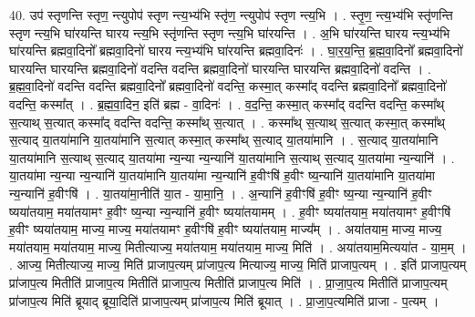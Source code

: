 \documentclass[17pt]{extarticle}
\begin{document}
40. उप॑ स्तृणन्ति स्तृण॒ न्त्युपोप॑ स्तृण न्त्य॒भ्य॑भि स्तृ॑ण॒ न्त्युपोप॑ स्तृण न्त्य॒भि । . स्तृ॒ण॒ न्त्य॒भ्य॑भि स्तृ॑णन्ति स्तृण न्त्य॒भि घा॑रयन्ति घारय न्त्य॒भि स्तृ॑णन्ति स्तृण न्त्य॒भि घा॑रयन्ति । . अ॒भि घा॑रयन्ति घारय न्त्य॒भ्य॑भि घा॑रयन्ति ब्रह्मवा॒दिनो᳚ ब्रह्मवा॒दिनो॑ घारय न्त्य॒भ्य॑भि घा॑रयन्ति ब्रह्मवा॒दिनः॑ । . घा॒र॒य॒न्ति॒ ब्र॒ह्म॒वा॒दिनो᳚ ब्रह्मवा॒दिनो॑ घारयन्ति घारयन्ति ब्रह्मवा॒दिनो॑ वदन्ति वदन्ति ब्रह्मवा॒दिनो॑ घारयन्ति घारयन्ति ब्रह्मवा॒दिनो॑ वदन्ति । . ब्र॒ह्म॒वा॒दिनो॑ वदन्ति वदन्ति ब्रह्मवा॒दिनो᳚ ब्रह्मवा॒दिनो॑ वदन्ति॒ कस्मा॒त् कस्मा᳚द् वदन्ति ब्रह्मवा॒दिनो᳚ ब्रह्मवा॒दिनो॑ वदन्ति॒ कस्मा᳚त् । . ब्र॒ह्म॒वा॒दिन॒ इति॑ ब्रह्म - वा॒दिनः॑ । . व॒द॒न्ति॒ कस्मा॒त् कस्मा᳚द् वदन्ति वदन्ति॒ कस्मा᳚थ् स॒त्याथ् स॒त्यात् कस्मा᳚द् वदन्ति वदन्ति॒ कस्मा᳚थ् स॒त्यात् । . कस्मा᳚थ् स॒त्याथ् स॒त्यात् कस्मा॒त् कस्मा᳚थ् स॒त्याद् या॒तया॑मानि या॒तया॑मानि स॒त्यात् कस्मा॒त् कस्मा᳚थ् स॒त्याद् या॒तया॑मानि । . स॒त्याद् या॒तया॑मानि या॒तया॑मानि स॒त्याथ् स॒त्याद् या॒तया॑मा न्य॒न्या न्य॒न्यानि॑ या॒तया॑मानि स॒त्याथ् स॒त्याद् या॒तया॑मा न्य॒न्यानि॑ । . या॒तया॑मा न्य॒न्या न्य॒न्यानि॑ या॒तया॑मानि या॒तया॑मा न्य॒न्यानि॑ ह॒वीꣳषि॑ ह॒वीꣳ ष्य॒न्यानि॑ या॒तया॑मानि या॒तया॑मा न्य॒न्यानि॑ ह॒वीꣳषि॑ । . या॒तया॑मा॒नीति॑ या॒त - या॒मा॒नि॒ । . अ॒न्यानि॑ ह॒वीꣳषि॑ ह॒वीꣳ ष्य॒न्या न्य॒न्यानि॑ ह॒वीꣳ ष्यया॑तयाम॒ मया॑तयामꣳ ह॒वीꣳ ष्य॒न्या न्य॒न्यानि॑ ह॒वीꣳ ष्यया॑तयामम् । . ह॒वीꣳ ष्यया॑तयाम॒ मया॑तयामꣳ ह॒वीꣳषि॑ ह॒वीꣳ ष्यया॑तयाम॒ माज्य॒ माज्य॒ मया॑तयामꣳ ह॒वीꣳषि॑ ह॒वीꣳ ष्यया॑तयाम॒ माज्य᳚म् । . अया॑तयाम॒ माज्य॒ माज्य॒ मया॑तयाम॒ मया॑तयाम॒ माज्य॒ मितीत्याज्य॒ मया॑तयाम॒ मया॑तयाम॒ माज्य॒ मिति॑ । . अया॑तयाम॒मित्यया॑त - या॒म॒म् । . आज्य॒ मितीत्याज्य॒ माज्य॒ मिति॑ प्राजाप॒त्यम् प्रा॑जाप॒त्य मित्याज्य॒ माज्य॒ मिति॑ प्राजाप॒त्यम् । . इति॑ प्राजाप॒त्यम् प्रा॑जाप॒त्य मितीति॑ प्राजाप॒त्य मितीति॑ प्राजाप॒त्य मितीति॑ प्राजाप॒त्य मिति॑ । . प्रा॒जा॒प॒त्य मितीति॑ प्राजाप॒त्यम् प्रा॑जाप॒त्य मिति॑ ब्रूयाद् ब्रूया॒दिति॑ प्राजाप॒त्यम् प्रा॑जाप॒त्य मिति॑ ब्रूयात् । . प्रा॒जा॒प॒त्यमिति॑ प्राजा - प॒त्यम् । \newline
\pagebreak
{}
\end{document}
